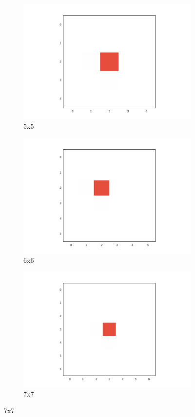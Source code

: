 \begin{figure}[h]
\centering
\begin{subfigure}[b]{.30\columnwidth}
\centering
\includegraphics[width=\columnwidth]{fig/seed_5x5}
\caption{5x5}
\end{subfigure}%
\begin{subfigure}[b]{.30\columnwidth}
\centering
\includegraphics[width=\columnwidth]{fig/seed_6x6}
\caption{6x6}
\end{subfigure}%
\begin{subfigure}[b]{.30\columnwidth}
\centering
\includegraphics[width=\columnwidth]{fig/seed_7x7}
\caption{7x7}
\end{subfigure}%


\end{figure}
